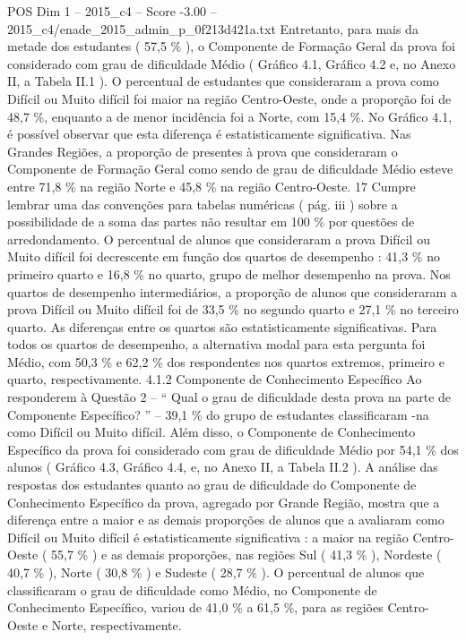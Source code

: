 \begin{textsample}{POS Dim 1 – 2015\_c4 – Score -3.00 – 2015\_c4/enade\_2015\_admin\_p\_0f213d421a.txt}
Entretanto, para mais da metade dos estudantes ( 57,5 \% ), o Componente de Formação Geral da prova foi considerado com grau de dificuldade Médio ( Gráfico 4.1, Gráfico 4.2 e, no Anexo II, a Tabela II.1 ).
O percentual de estudantes que consideraram a prova como Difícil ou Muito difícil foi maior na região Centro-Oeste, onde a proporção foi de 48,7 \%, enquanto a de menor incidência foi a Norte, com 15,4 \%.
No Gráfico 4.1, é possível observar que esta diferença é estatisticamente significativa.
Nas Grandes Regiões, a proporção de presentes à prova que consideraram o Componente de Formação Geral como sendo de grau de dificuldade Médio esteve entre 71,8 \% na região Norte e 45,8 \% na região Centro-Oeste. 17 Cumpre lembrar uma das convenções para tabelas numéricas ( pág. iii ) sobre a possibilidade de a soma das partes não resultar em 100 \% por questões de arredondamento.
O percentual de alunos que consideraram a prova Difícil ou Muito difícil foi decrescente em função dos quartos de desempenho : 41,3 \% no primeiro quarto e 16,8 \% no quarto, grupo de melhor desempenho na prova.
Nos quartos de desempenho intermediários, a proporção de alunos que consideraram a prova Difícil ou Muito difícil foi de 33,5 \% no segundo quarto e 27,1 \% no terceiro quarto.
As diferenças entre os quartos são estatisticamente significativas.
Para todos os quartos de desempenho, a alternativa modal para esta pergunta foi Médio, com 50,3 \% e 62,2 \% dos respondentes nos quartos extremos, primeiro e quarto, respectivamente. 4.1.2 Componente de Conhecimento Específico Ao responderem à Questão 2 – “ Qual o grau de dificuldade desta prova na parte de Componente Específico? ” – 39,1 \% do grupo de estudantes classificaram -na como Difícil ou Muito difícil.
Além disso, o Componente de Conhecimento Específico da prova foi considerado com grau de dificuldade Médio por 54,1 \% dos alunos ( Gráfico 4.3, Gráfico 4.4, e, no Anexo II, a Tabela II.2 ).
A análise das respostas dos estudantes quanto ao grau de dificuldade do Componente de Conhecimento Específico da prova, agregado por Grande Região, mostra que a diferença entre a maior e as demais proporções de alunos que a avaliaram como Difícil ou Muito difícil é estatisticamente significativa : a maior na região Centro-Oeste ( 55,7 \% ) e as demais proporções, nas regiões Sul ( 41,3 \% ), Nordeste ( 40,7 \% ), Norte ( 30,8 \% ) e Sudeste ( 28,7 \% ).
O percentual de alunos que classificaram o grau de dificuldade como Médio, no Componente de Conhecimento Específico, variou de 41,0 \% a 61,5 \%, para as regiões Centro-Oeste e Norte, respectivamente.

\end{textsample}
